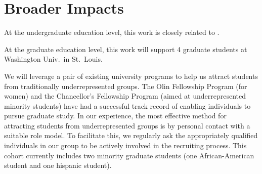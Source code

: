 \section{Broader Impacts}
\label{sec:broader}



At the undergraduate education level, this work is closely related to
.

At the graduate education level, this work will support 4 graduate
students at Washington Univ.~in St.~Louis.

We will leverage a pair of existing university programs to help us
attract students from traditionally underrepresented groups.  The Olin
Fellowship Program (for women) and the Chancellor's Fellowship Program
(aimed at underrepresented minority students) have had a successful track
record of enabling individuals to pursue graduate study.  In our
experience, the most effective method for attracting students from
underrepresented groups is by personal contact with a suitable role
model.  To facilitate this, we regularly ask the appropriately
qualified individuals in our group to be actively involved in the
recruiting process.  This cohort currently includes two
minority graduate students (one African-American student and one hispanic 
student). 
